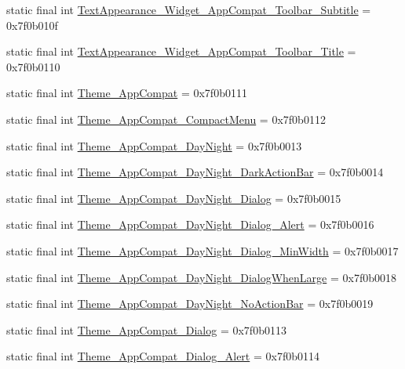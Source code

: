 \begin{CompactItemize}
static final int \hyperlink{classandroid_1_1support_1_1v4_1_1_r_1_1style_369bd44e06b814b1349d6188f749424a}{TextAppearance\_\-Widget\_\-AppCompat\_\-Toolbar\_\-Subtitle} = 0x7f0b010f
\item 
static final int \hyperlink{classandroid_1_1support_1_1v4_1_1_r_1_1style_85440ea9ae3b842542b4f888778b9eb6}{TextAppearance\_\-Widget\_\-AppCompat\_\-Toolbar\_\-Title} = 0x7f0b0110
\item 
static final int \hyperlink{classandroid_1_1support_1_1v4_1_1_r_1_1style_f4bfc77fd5190a79c587f934a9b6704e}{Theme\_\-AppCompat} = 0x7f0b0111
\item 
static final int \hyperlink{classandroid_1_1support_1_1v4_1_1_r_1_1style_487784ec9b01b2ea7ae3c82b0b776925}{Theme\_\-AppCompat\_\-CompactMenu} = 0x7f0b0112
\item 
static final int \hyperlink{classandroid_1_1support_1_1v4_1_1_r_1_1style_01132b6bc9a4a2b12c7913ba3877ea68}{Theme\_\-AppCompat\_\-DayNight} = 0x7f0b0013
\item 
static final int \hyperlink{classandroid_1_1support_1_1v4_1_1_r_1_1style_80a69a5ddc97816549f87e93687d552e}{Theme\_\-AppCompat\_\-DayNight\_\-DarkActionBar} = 0x7f0b0014
\item 
static final int \hyperlink{classandroid_1_1support_1_1v4_1_1_r_1_1style_cfaf39b20cdd370e292510c8f2f95ea0}{Theme\_\-AppCompat\_\-DayNight\_\-Dialog} = 0x7f0b0015
\item 
static final int \hyperlink{classandroid_1_1support_1_1v4_1_1_r_1_1style_e7ce744b9157f8601ce81fc30cc6fb9d}{Theme\_\-AppCompat\_\-DayNight\_\-Dialog\_\-Alert} = 0x7f0b0016
\item 
static final int \hyperlink{classandroid_1_1support_1_1v4_1_1_r_1_1style_042128e8050efa5d5e279541482eaff9}{Theme\_\-AppCompat\_\-DayNight\_\-Dialog\_\-MinWidth} = 0x7f0b0017
\item 
static final int \hyperlink{classandroid_1_1support_1_1v4_1_1_r_1_1style_f96b35041686b460ab969f83ffaa69c5}{Theme\_\-AppCompat\_\-DayNight\_\-DialogWhenLarge} = 0x7f0b0018
\item 
static final int \hyperlink{classandroid_1_1support_1_1v4_1_1_r_1_1style_e6a1a33e734862de77f31cc46343e668}{Theme\_\-AppCompat\_\-DayNight\_\-NoActionBar} = 0x7f0b0019
\item 
static final int \hyperlink{classandroid_1_1support_1_1v4_1_1_r_1_1style_dbdc2c935c18ff43377373cd0a9ca3d7}{Theme\_\-AppCompat\_\-Dialog} = 0x7f0b0113
\item 
static final int \hyperlink{classandroid_1_1support_1_1v4_1_1_r_1_1style_7b5d3c3cb14c71247e58990657a030df}{Theme\_\-AppCompat\_\-Dialog\_\-Alert} = 0x7f0b0114

\end{CompactItemize}
